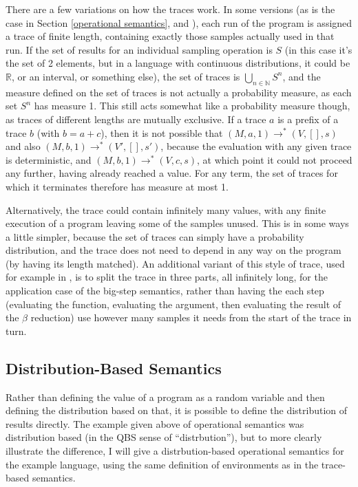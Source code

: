 \documentclass[titlepage]{article}
\begin{document}
There are a few variations on how the traces work. In some versions (as is the case in Section \ref{operational semantics}, and \cite{borgstrom2016lambda}), each run of the program is assigned a trace of finite length, containing exactly those samples actually used in that run. If the set of results for an individual sampling operation is $S$ (in this case it's the set of 2 elements, but in a language with continuous distributions, it could be $\mathbb R$, or an interval, or something else), the set of traces is $\bigcup_{n \in \mathbb N} S^n$, and the measure defined on the set of traces is not actually a probability measure, as each set $S^n$ has measure 1. This still acts somewhat like a probability measure though, as traces of different lengths are mutually exclusive. If a trace $a$ is a prefix of a trace $b$ (with $b = a + c$), then it is not possible that $(M, a, 1) \to^* (V, [], s)$ and also $(M, b, 1) \to^* (V', [], s')$, because the evaluation with any given trace is deterministic, and $(M, b, 1) \to^* (V, c, s)$, at which point it could not proceed any further, having already reached a value. For any term, the set of traces for which it terminates therefore has measure at most 1.

Alternatively, the trace could contain infinitely many values, with any finite execution of a program leaving some of the samples unused. This is in some ways a little simpler, because the set of traces can simply have a probability distribution, and the trace does not need to depend in any way on the program (by having its length matched). An additional variant of this style of trace, used for example in \cite{culpepper17}, is to split the trace in three parts, all infinitely long, for the application case of the big-step semantics, rather than having the each step (evaluating the function, evaluating the argument, then evaluating the result of the $\beta$ reduction) use however many samples it needs from the start of the trace in turn.

\subsection{Distribution-Based Semantics}
Rather than defining the value of a program as a random variable and then defining the distribution based on that, it is possible to define the distribution of results directly. The example given above of operational semantics was distribution based (in the QBS sense of ``distrbution''), but to more clearly illustrate the difference, I will give a distrbution-based operational semantics for the example language, using the same definition of environments as in the trace-based semantics.
\end{document}
